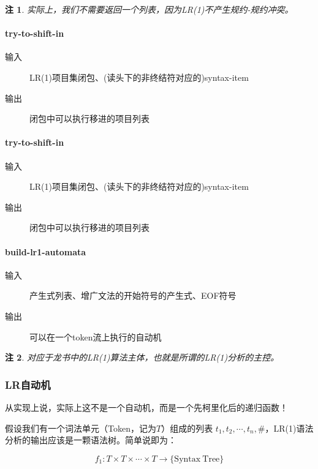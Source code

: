 \documentclass[lang=cn]{ctexart}
\newtheorem{remark}{注}
\begin{document}
{\begin{remark}
	实际上，我们不需要返回一个列表，因为LR(1)不产生规约-规约冲突。
\end{remark}

\paragraph{try-to-shift-in}
\begin{description}
	\item[输入] LR(1)项目集闭包、(读头下的非终结符对应的)syntax-item
	\item[输出] 闭包中可以执行移进的项目列表
\end{description}


\paragraph{try-to-shift-in}
\begin{description}
	\item[输入] LR(1)项目集闭包、(读头下的非终结符对应的)syntax-item
	\item[输出] 闭包中可以执行移进的项目列表
\end{description}



\paragraph{build-lr1-automata}
\begin{description}
	\item[输入] 产生式列表、增广文法的开始符号的产生式、EOF符号
	\item[输出] 可以在一个token流上执行的自动机
\end{description}

\begin{remark}
	对应于龙书中的LR(1)算法主体，也就是所谓的LR(1)分析的主控。
\end{remark}

\subsubsection{LR自动机}

从实现上说，实际上这不是一个自动机，而是一个先柯里化后的递归函数！

假设我们有一个词法单元（Token，记为$T$）组成的列表 $t_1, t_2, \cdots, t_n, \#$，LR(1)语法分析的输出应该是一颗语法树。简单说即为：

$$
f_1:T\times T\times\cdots \times T \rightarrow \{\mathrm{Syntax~Tree}\}
$$

}
\end{document}
